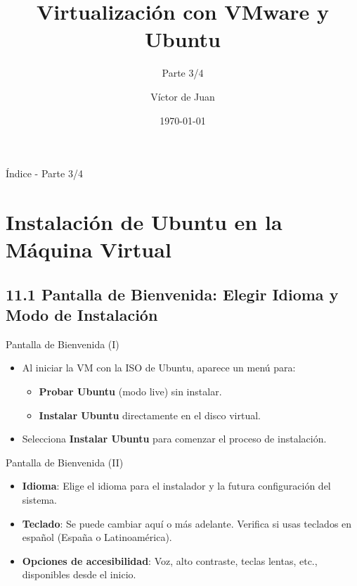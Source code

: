 \documentclass{beamer}
\title{Virtualización con VMware y Ubuntu}
\subtitle{Parte 3/4}
\author{Víctor de Juan}
\date{\today}
\begin{document}
\begin{frame}
	\titlepage
\end{frame}

\begin{frame}{Índice - Parte 3/4}
	\tableofcontents[hideallsubsections]
\end{frame}

\section{Instalación de Ubuntu en la Máquina Virtual}

\subsection{11.1 Pantalla de Bienvenida: Elegir Idioma y Modo de Instalación}
\begin{frame}{Pantalla de Bienvenida (I)}
	\begin{itemize}
		\item Al iniciar la VM con la ISO de Ubuntu, aparece un menú para:
			\begin{itemize}
				\item \textbf{Probar Ubuntu} (modo live) sin instalar.
				\item \textbf{Instalar Ubuntu} directamente en el disco virtual.
			\end{itemize}
		\item Selecciona \textbf{Instalar Ubuntu} para comenzar el proceso de instalación.
	\end{itemize}
\end{frame}

\begin{frame}{Pantalla de Bienvenida (II)}
	\begin{itemize}
		\item \textbf{Idioma}: Elige el idioma para el instalador y la futura configuración del sistema.
		\item \textbf{Teclado}: Se puede cambiar aquí o más adelante. Verifica si usas teclados en español (España o Latinoamérica).
		\item \textbf{Opciones de accesibilidad}: Voz, alto contraste, teclas lentas, etc., disponibles desde el inicio.
	\end{itemize}
\end{frame}
\end{document}
